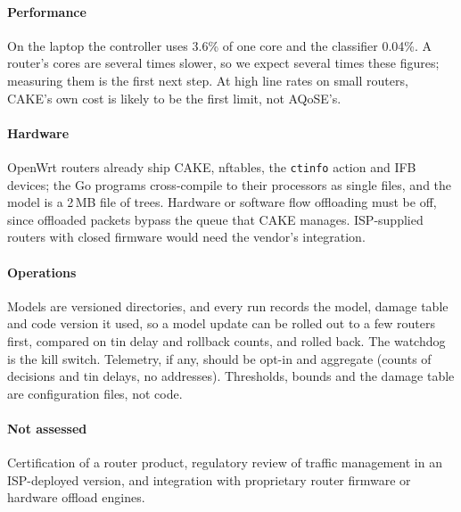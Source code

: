 \documentclass[11pt,a4paper]{article}
\begin{document}
\paragraph{Performance} On the laptop the controller uses 3.6\% of one core and the classifier 0.04\%. A router's cores are several times slower, so we expect several times these figures; measuring them is the first next step. At high line rates on small routers, CAKE's own cost is likely to be the first limit, not AQoSE's.

\paragraph{Hardware} OpenWrt routers already ship CAKE, nftables, the \texttt{ctinfo} action and IFB devices; the Go programs cross-compile to their processors as single files, and the model is a 2\,MB file of trees. Hardware or software flow offloading must be off, since offloaded packets bypass the queue that CAKE manages. ISP-supplied routers with closed firmware would need the vendor's integration.

\paragraph{Operations} Models are versioned directories, and every run records the model, damage table and code version it used, so a model update can be rolled out to a few routers first, compared on tin delay and rollback counts, and rolled back. The watchdog is the kill switch. Telemetry, if any, should be opt-in and aggregate (counts of decisions and tin delays, no addresses). Thresholds, bounds and the damage table are configuration files, not code.

\paragraph{Not assessed} Certification of a router product, regulatory review of traffic management in an ISP-deployed version, and integration with proprietary router firmware or hardware offload engines.
\end{document}
